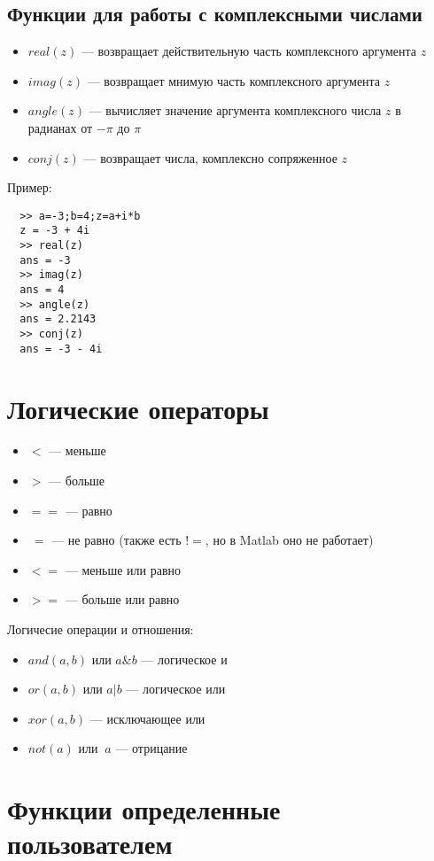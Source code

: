 \documentclass[12pt, a4paper,oneside]{book}
\begin{document}
\subsection{Функции для работы с комплексными числами}
\begin{itemize}
  \item{$real(z)$ --- возвращает действительную часть комплексного аргумента $z$}
  \item{$imag(z)$ --- возвращает мнимую часть комплексного аргумента $z$}
  \item{$angle(z)$ --- вычисляет значение аргумента комплексного числа $z$ в радианах от $-\pi$ до $\pi$}
  \item{$conj(z)$ --- возвращает числа, комплексно сопряженное $z$}
\end{itemize}
Пример:
\begin{lstlisting}
  >> a=-3;b=4;z=a+i*b
  z = -3 + 4i
  >> real(z)
  ans = -3
  >> imag(z)
  ans = 4
  >> angle(z)
  ans = 2.2143
  >> conj(z)
  ans = -3 - 4i
\end{lstlisting}

\section{Логические операторы}
\begin{itemize}
  \item{$<$ --- меньше}
  \item{$>$ --- больше}
  \item{$==$ --- равно}
  \item{$~=$ --- не равно (также есть $!=$, но в Matlab оно не работает)}
  \item{$<=$ --- меньше или равно}
  \item{$>=$ --- больше или равно}
\end{itemize}
Логичесие операции и отношения:
\begin{itemize}
  \item{$and(a, b)$ или $a \& b$ --- логическое и}
  \item{$or(a, b)$ или $a | b$ --- логическое или}
  \item{$xor(a, b)$ --- исключающее или}
  \item{$not(a)$ или $~a$ --- отрицание}
\end{itemize}

\section{Функции определенные пользователем}
\end{document}
